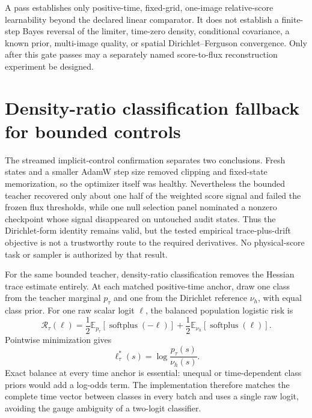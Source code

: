 \documentclass[11pt]{article}
\numberwithin{equation}{section}
\newcommand{\E}{\mathbb E}
\newcommand{\1}{\mathbf 1}
\begin{document}
A pass establishes only positive-time, fixed-grid, one-image relative-score
learnability beyond the declared linear comparator.  It does not establish a
finite-step Bayes reversal of the limiter, time-zero density, conditional
covariance, a known prior, multi-image quality, or spatial
Dirichlet--Ferguson convergence.  Only after this gate passes may a separately
named score-to-flux reconstruction experiment be designed.

\section{Density-ratio classification fallback for bounded controls}
\label{sec:density-ratio-controls}

The streamed implicit-control confirmation separates two conclusions.  Fresh
states and a smaller AdamW step size removed clipping and fixed-state
memorization, so the optimizer itself was healthy.  Nevertheless the bounded
teacher recovered only about one half of the weighted score signal and failed
the frozen flux thresholds, while one null selection panel nominated a
nonzero checkpoint whose signal disappeared on untouched audit states.  Thus
the Dirichlet-form identity remains valid, but the tested empirical
trace-plus-drift objective is not a trustworthy route to the required
derivatives.  No physical-score task or sampler is authorized by that result.

For the same bounded teacher, density-ratio classification removes the Hessian
trace estimate entirely.  At each matched positive-time anchor, draw one class
from the teacher marginal \(p_\tau\) and one from the Dirichlet reference
\(\nu_h\), with equal class prior.  For one raw scalar logit \(\ell\), the
balanced population logistic risk is
\begin{equation}\label{eq:density-ratio-logistic-risk}
  \mathcal R_\tau(\ell)
  =\frac12\E_{p_\tau}\!\left[\operatorname{softplus}(-\ell)\right]
   +\frac12\E_{\nu_h}\!\left[\operatorname{softplus}(\ell)\right].
\end{equation}
Pointwise minimization gives
\begin{equation}\label{eq:density-ratio-bayes-logit}
  \ell_\tau^*(s)=\log\frac{p_\tau(s)}{\nu_h(s)}.
\end{equation}
Exact balance at every time anchor is essential: unequal or time-dependent
class priors would add a log-odds term.  The implementation therefore matches
the complete time vector between classes in every batch and uses a single raw
logit, avoiding the gauge ambiguity of a two-logit classifier.
\end{document}
